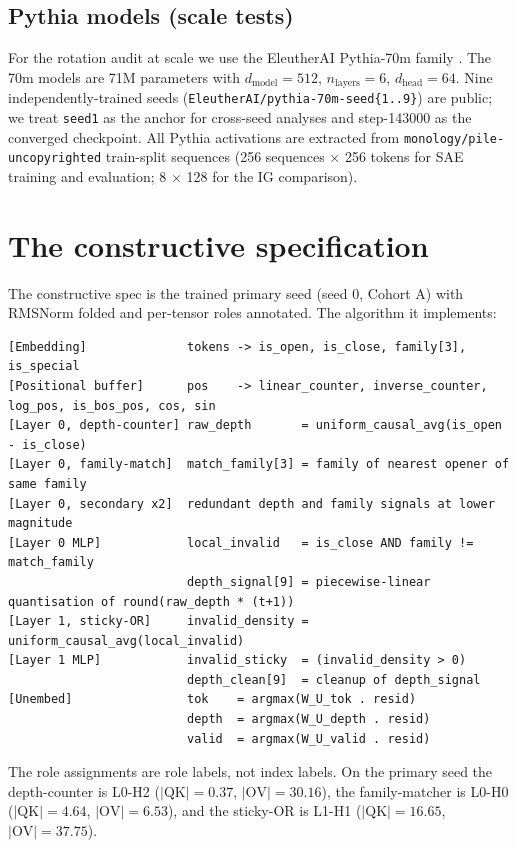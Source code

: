 \documentclass[11pt,letterpaper]{article}
\newcommand{\dmodel}{d_{\mathrm{model}}}
\begin{document}
\subsection{Pythia models (scale tests)}

For the rotation audit at scale we use the EleutherAI Pythia-70m family \citep{biderman2023pythia}. The 70m models are 71M parameters with $\dmodel = 512$, $n_{\mathrm{layers}} = 6$, $d_{\mathrm{head}} = 64$. Nine independently-trained seeds (\texttt{EleutherAI/pythia-70m-seed\{1..9\}}) are public; we treat \texttt{seed1} as the anchor for cross-seed analyses and step-143000 as the converged checkpoint. All Pythia activations are extracted from \texttt{monology/pile-uncopyrighted} train-split sequences (256 sequences $\times$ 256 tokens for SAE training and evaluation; 8 $\times$ 128 for the IG comparison).

\section{The constructive specification}
\label{sec:spec}

The constructive spec is the trained primary seed (seed 0, Cohort A) with RMSNorm folded and per-tensor roles annotated. The algorithm it implements:

\begin{small}
\begin{verbatim}
[Embedding]              tokens -> is_open, is_close, family[3], is_special
[Positional buffer]      pos    -> linear_counter, inverse_counter, log_pos, is_bos_pos, cos, sin
[Layer 0, depth-counter] raw_depth       = uniform_causal_avg(is_open - is_close)
[Layer 0, family-match]  match_family[3] = family of nearest opener of same family
[Layer 0, secondary x2]  redundant depth and family signals at lower magnitude
[Layer 0 MLP]            local_invalid   = is_close AND family != match_family
                         depth_signal[9] = piecewise-linear quantisation of round(raw_depth * (t+1))
[Layer 1, sticky-OR]     invalid_density = uniform_causal_avg(local_invalid)
[Layer 1 MLP]            invalid_sticky  = (invalid_density > 0)
                         depth_clean[9]  = cleanup of depth_signal
[Unembed]                tok    = argmax(W_U_tok . resid)
                         depth  = argmax(W_U_depth . resid)
                         valid  = argmax(W_U_valid . resid)
\end{verbatim}
\end{small}

The role assignments are role labels, not index labels. On the primary seed the depth-counter is L0-H2 ($|\mathrm{QK}| = 0.37$, $|\mathrm{OV}| = 30.16$), the family-matcher is L0-H0 ($|\mathrm{QK}| = 4.64$, $|\mathrm{OV}| = 6.53$), and the sticky-OR is L1-H1 ($|\mathrm{QK}| = 16.65$, $|\mathrm{OV}| = 37.75$).
\end{document}
